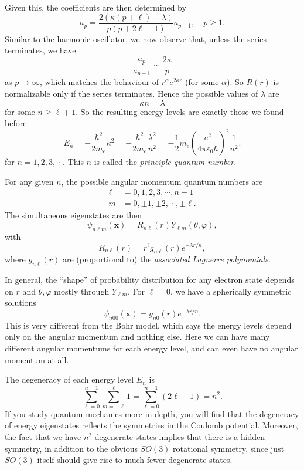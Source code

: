 \documentclass[a4paper]{article}
\begin{document}
Given this, the coefficients are then determined by
\[
  a_p = \frac{2(\kappa (p + \ell) - \lambda)}{p(p + 2\ell + 1)} a_{p - 1}, \quad p \geq 1.
\]
Similar to the harmonic oscillator, we now observe that, unless the series terminates, we have
\[
  \frac{a_p}{a_{p - 1}} \sim \frac{2\kappa}{p}
\]
as $p \to \infty$, which matches the behaviour of $r^\alpha e^{2 \kappa r}$ (for some $\alpha$). So $R(r)$ is normalizable only if the series terminates. Hence the possible values of $\lambda$ are
\[
  \kappa n = \lambda
\]
for some $n \geq \ell + 1$. So the resulting energy levels are exactly those we found before:
\[
  E_n = -\frac{\hbar^2}{2 m_e} \kappa^2 = -\frac{\hbar^2}{2 m_e} \frac{\lambda^2}{n^2} = -\frac{1}{2}m_e\left(\frac{e^2}{4 \pi \varepsilon_0 \hbar}\right)^2 \frac{1}{n^2}.
\]
for $n = 1, 2, 3, \cdots$. This $n$ is called the \emph{principle quantum number}.

For any given $n$, the possible angular momentum quantum numbers are
\begin{align*}
  \ell &= 0, 1, 2, 3, \cdots, n - 1\\
  m &= 0, \pm 1, \pm 2, \cdots, \pm \ell.
\end{align*}
The simultaneous eigenstates are then
\[
  \psi_{n\ell m} (\mathbf{x}) = R_{n\ell}(r)Y_{\ell m}(\theta, \varphi),
\]
with
\[
  R_{n\ell}(r) = r^\ell g_{n\ell}(r)e^{-\lambda r/n},
\]
where $g_{n\ell}(r)$ are (proportional to) the \emph{associated Laguerre polynomials}.

In general, the ``shape'' of probability distribution for any electron state depends on $r$ and $\theta, \varphi$ mostly through $Y_{\ell m}$. For $\ell = 0$, we have a spherically symmetric solutions
\[
  \psi_{n00}(\mathbf{x}) = g_{n0}(r) e^{-\lambda r/n}.
\]
This is very different from the Bohr model, which says the energy levels depend only on the angular momentum and nothing else. Here we can have many different angular momentums for each energy level, and can even have no angular momentum at all.

The degeneracy of each energy level $E_n$ is
\[
  \sum_{\ell = 0}^{n - 1} \sum_{m = -\ell}^\ell 1 = \sum_{\ell = 0}^{n - 1} (2\ell + 1) = n^2.
\]
If you study quantum mechanics more in-depth, you will find that the degeneracy of energy eigenstates reflects the symmetries in the Coulomb potential. Moreover, the fact that we have $n^2$ degenerate states implies that there is a hidden symmetry, in addition to the obvious $SO(3)$ rotational symmetry, since just $SO(3)$ itself should give rise to much fewer degenerate states.
\end{document}

